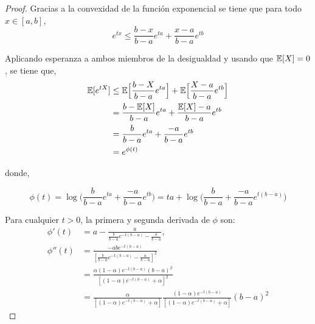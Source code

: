         \begin{proof}
            Gracias a la convexidad de la función exponencial se tiene que para todo $x \in [a,b]$,
            \begin{equation}
                e^{tx} \leq \frac{b-x}{b-a}e^{ta} +  \frac{x-a}{b-a}e^{tb}
            \end{equation}
            
            \noindent Aplicando esperanza a ambos miembros de la desigualdad y usando que $\mathbb{E}[X] = 0$, se tiene que,
            \begin{equation}
            \begin{aligned}
                \mathbb{E}[e^{tX}] & \leq \mathbb{E} \Big[ \frac{b-X}{b-a} e^{ta} \Big] + \mathbb{E} \Big[\frac{X - a}{b - a} e^{tb} \Big] \\ 
                 & = \frac{b-\mathbb{E}[X]}{b-a} e^{ta} + \frac{\mathbb{E}[X] - a}{b - a} e^{tb} \\
                 & = \frac{b}{b-a} e^{ta} + \frac{- a}{b - a} e^{tb} \\
                 & = e^{\phi(t)}
            \end{aligned}
            \end{equation}
            
            \noindent donde,
            
            \begin{equation}
                \phi(t) = \log\Big(\frac{b}{b-a} e^{ta} + \frac{- a}{b - a} e^{tb}\Big) = ta + \log\Big(\frac{b}{b-a} + \frac{- a}{b - a} e^{t(b-a)}\Big)
            \end{equation}
            
            \noindent Para cualquier $t>0$, la primera y segunda derivada de $\phi$ son:
            \begin{equation}
                \begin{aligned}
                        \phi'(t) & = a - \frac{a}{\frac{b}{b-a} e^{-t(b-a)} - \frac{a}{b-a}}, \\
                        \phi''(t) & = \frac{-ab e^{-t(b-a)}}{[\frac{b}{b-a} e^{-t(b-a)} - \frac{a}{b-a}]^2} \\
                        & = \frac{\alpha(1-\alpha) e^{-t(b-a)}(b-a)^2}{[(1-\alpha) e^{-t(b-a)} + \alpha]^2} \\
                        & = \frac{\alpha}{[(1-\alpha) e^{-t(b-a)} + \alpha]} \frac{(1-\alpha) e^{-t(b-a)}}{[(1-\alpha) e^{-t(b-a)} + \alpha]}(b-a)^2
                \end{aligned}
            \end{equation}
            

\end{proof}
